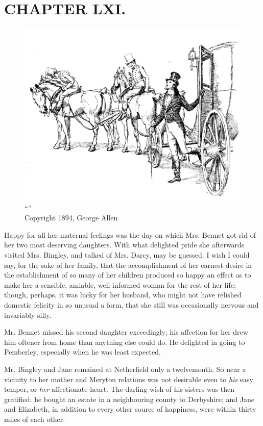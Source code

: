 \chapter{CHAPTER LXI.}

\begin{figure}[htbp]
    \centering
    \includegraphics[width=\textwidth]{illustrations/i_031.jpg}
    \caption{“”\\ Copyright 1894, George Allen}
    \label{fig:image}
\end{figure}


Happy for all her maternal feelings was the day on which Mrs. Bennet got rid of her two most deserving daughters. With what delighted pride she afterwards visited Mrs. Bingley, and talked of Mrs. Darcy, may be guessed. I wish I could say, for the sake of her family, that the accomplishment of her earnest desire in the establishment of so many of her children produced so happy an effect as to make her a sensible, amiable, well-informed woman for the rest of her life; though, perhaps, it was lucky for her husband, who might not have relished domestic felicity in so unusual a form, that she still was occasionally nervous and invariably silly.

Mr. Bennet missed his second daughter exceedingly; his affection for her drew him oftener from home than anything else could do. He delighted in going to Pemberley, especially when he was least expected.

Mr. Bingley and Jane remained at Netherfield only a twelvemonth. So near a vicinity to her mother and Meryton relations was not desirable even to \textit{his} easy temper, or \textit{her} affectionate heart. The darling wish of his sisters was then gratified: he bought an estate in a neighbouring county to Derbyshire; and Jane and Elizabeth, in addition to every other source of happiness, were within thirty miles of each other.


